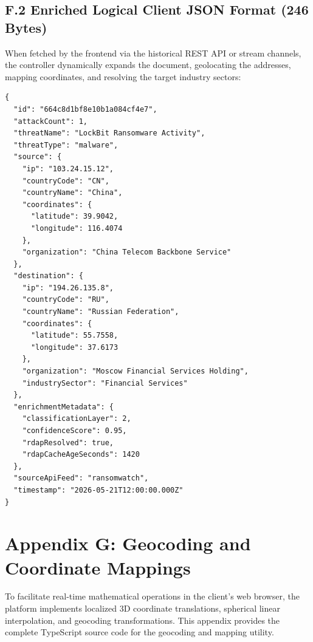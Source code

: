 \subsection*{F.2 Enriched Logical Client JSON Format (246 Bytes)}
When fetched by the frontend via the historical REST API or stream channels, the controller dynamically expands the document, geolocating the addresses, mapping coordinates, and resolving the target industry sectors:
\begin{verbatim}
{
  "id": "664c8d1bf8e10b1a084cf4e7",
  "attackCount": 1,
  "threatName": "LockBit Ransomware Activity",
  "threatType": "malware",
  "source": {
    "ip": "103.24.15.12",
    "countryCode": "CN",
    "countryName": "China",
    "coordinates": {
      "latitude": 39.9042,
      "longitude": 116.4074
    },
    "organization": "China Telecom Backbone Service"
  },
  "destination": {
    "ip": "194.26.135.8",
    "countryCode": "RU",
    "countryName": "Russian Federation",
    "coordinates": {
      "latitude": 55.7558,
      "longitude": 37.6173
    },
    "organization": "Moscow Financial Services Holding",
    "industrySector": "Financial Services"
  },
  "enrichmentMetadata": {
    "classificationLayer": 2,
    "confidenceScore": 0.95,
    "rdapResolved": true,
    "rdapCacheAgeSeconds": 1420
  },
  "sourceApiFeed": "ransomwatch",
  "timestamp": "2026-05-21T12:00:00.000Z"
}
\end{verbatim}

\section*{Appendix G: Geocoding and Coordinate Mappings}
To facilitate real-time mathematical operations in the client's web browser, the platform implements localized 3D coordinate translations, spherical linear interpolation, and geocoding transformations. This appendix provides the complete TypeScript source code for the geocoding and mapping utility.

